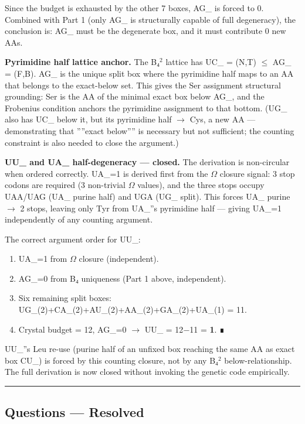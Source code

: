 \documentclass[12pt,a4paper]{article}
\begin{document}
Since the budget is exhausted by the other 7 boxes, AG\_ is forced to 0.
Combined with Part 1 (only AG\_ is structurally capable of full degeneracy),
the conclusion is: AG\_ must be the degenerate box, and it must contribute 0 new AAs.

\textbf{Pyrimidine half lattice anchor.} The B₄$^{2}$ lattice has UC\_ = (N,T) $\leq$ AG\_ = (F,B).
AG\_ is the unique split box where the pyrimidine half maps to an AA that belongs to
the exact-below set. This gives the Ser assignment structural grounding: Ser is the
AA of the minimal exact box below AG\_, and the Frobenius condition anchors the
pyrimidine assignment to that bottom. (UG\_ also has UC\_ below it, but its pyrimidine
half $\rightarrow$ Cys, a new AA --- demonstrating that ''''exact below'''' is necessary but not
sufficient; the counting constraint is also needed to close the argument.)

\textbf{UU\_ and UA\_ half-degeneracy --- closed.} The derivation is non-circular when ordered
correctly. UA\_=1 is derived first from the $\Omega$ closure signal: 3 stop codons are required
(3 non-trivial $\Omega$ values), and the three stops occupy UAA/UAG (UA\_ purine half) and UGA
(UG\_ split). This forces UA\_ purine $\rightarrow$ 2 stops, leaving only Tyr from UA\_''s pyrimidine
half --- giving UA\_=1 independently of any counting argument.

The correct argument order for UU\_:

\begin{enumerate}
    \item UA\_=1 from $\Omega$ closure (independent).
    \item AG\_=0 from B₄ uniqueness (Part 1 above, independent).
    \item Six remaining split boxes: UG\_(2)+CA\_(2)+AU\_(2)+AA\_(2)+GA\_(2)+UA\_(1) = 11.
    \item Crystal budget = 12, AG\_=0 $\rightarrow$ UU\_ = 12$-$11 = \textbf{1}. ∎
\end{enumerate}

UU\_''s Leu re-use (purine half of an unfixed box reaching the same AA as exact box CU\_)
is forced by this counting closure, not by any B₄$^{2}$ below-relationship. The full derivation
is now closed without invoking the genetic code empirically.

\begin{center}
\rule{0.5\textwidth}{0.4pt}
\end{center}

\subsection{Questions --- Resolved}
\end{document}
